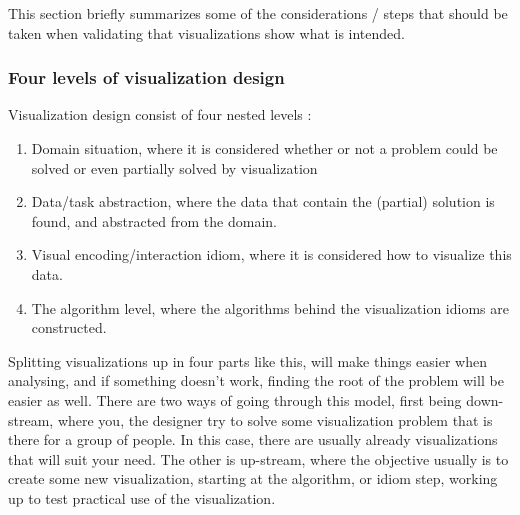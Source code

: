 \documentclass[Report.tex]{subfiles}
\begin{document}
	This section briefly summarizes some of the considerations / steps that should be taken when validating that visualizations show what is intended.
	\subsubsection{Four levels of visualization design}
	Visualization design consist of four  nested levels \cite[68]{Tamara}:
	\begin{enumerate}
		\item Domain situation, where it is considered whether or not a problem could be solved or even partially solved by visualization
		\item Data/task abstraction, where the data that contain the (partial) solution is found, and abstracted from the domain.
		\item Visual encoding/interaction idiom, where it is considered how to visualize this data.
		\item The algorithm level, where the algorithms behind the visualization idioms are constructed.
	\end{enumerate}
	Splitting visualizations up in four parts like this, will make things easier when analysing, and if something doesn't work, finding the root of the problem will be easier as well.
	There are two ways of going through this model, first being down-stream, where you, the designer try to solve some visualization problem that is there for a group of people. In this case, there are usually already visualizations that will suit your need. The other is up-stream, where the objective usually is to create some new visualization, starting at the algorithm, or idiom step, working up to test practical use of the visualization.
	 
	
\end{document}
